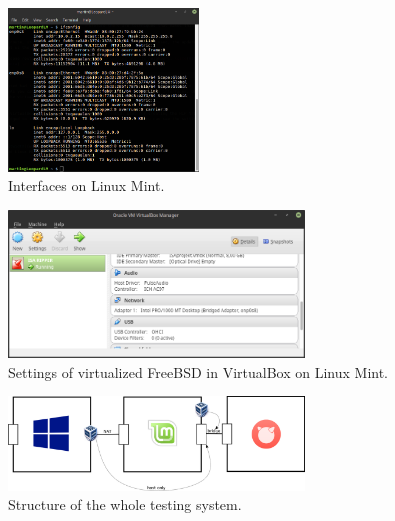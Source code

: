 \documentclass[10pt,a4paper,titlepage]{article}
\begin{document}
            \begin{figure}[h!]
                \begin{center}
                    \includegraphics[width=0.45\textwidth]{mintifconfig.png}
                    \caption{Interfaces on Linux Mint. \label{fig:MintIfconfig}}
                \end{center}
            \end{figure}

            \begin{figure}[h!]
                \begin{center}
                    \includegraphics[width=0.70\textwidth]{mintbsd.png}
                    \caption{Settings of virtualized FreeBSD in VirtualBox on Linux Mint. \label{fig:VBMintBSD}}
                \end{center}
            \end{figure}

            \begin{figure}[h!]
                \begin{center}
                    \includegraphics[width=0.70\textwidth]{programming.png}
                    \caption{Structure of the whole testing system. \label{fig:TestingSystem} \cite{WindowsLogo} \cite{MintLogo} \cite{FreeBSDLogo} \cite{VirtualBoxLogo}}
                \end{center}
            \end{figure}
        
\end{document}
